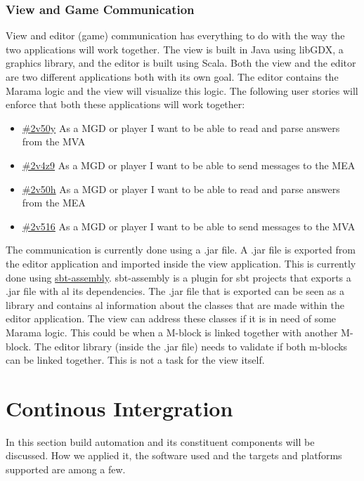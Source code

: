 \documentclass[10pt]{extarticle} %
\begin{document}
    \subsubsection{View and Game Communication}
    View and editor (game) communication has everything to do with the way the two applications will work together.
    The view is built in Java using libGDX, a graphics library, and the editor is built using Scala.
    Both the view and the editor are two different applications both with its own goal.
    The editor contains the Marama logic and the view will visualize this logic.
    The following user stories will enforce that both these applications will work together:
    \begin{itemize}
        \item{\href{\clickup{2v50y}}{\#2v50y} As a MGD or player I want to be able to read and parse answers from the MVA}
        \item{\href{\clickup{2v4z9}}{\#2v4z9} As a MGD or player I want to be able to send messages to the MEA}
        \item{\href{\clickup{2v50h}}{\#2v50h} As a MGD or player I want to be able to read and parse answers from the MEA}
        \item{\href{\clickup{2v516}}{\#2v516} As a MGD or player I want to be able to send messages to the MVA}
    \end{itemize}
    The communication is currently done using a .jar file.
    A .jar file is exported from the editor application and imported inside the view application.
    This is currently done using {\href{https://github.com/sbt/sbt-assembly}{sbt-assembly}}.
    sbt-assembly is a plugin for sbt projects that exports a .jar file with al its dependencies.
    The .jar file that is exported can be seen as a library and contains al information about the classes that are made within the editor application.
    The view can address these classes if it is in need of some Marama logic.
    This could be when a M-block is linked together with another M-block.
    The editor library (inside the .jar file) needs to validate if both m-blocks can be linked together.
    This is not a task for the view itself.

    \newpage
    \section{Continous Intergration}
    In this section build automation and its constituent components will be discussed.
    How we applied it, the software used and the targets and platforms supported are among a few.

    \newpage
    

    
\end{document}
